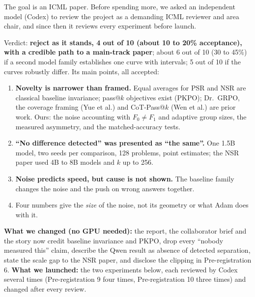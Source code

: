 \documentclass[11pt]{article}
\begin{document}
\begin{why}
The goal is an ICML paper. Before spending more, we asked an independent model (Codex) to review the project as a demanding ICML reviewer and area chair, and since then it reviews every experiment before launch.
\end{why}
\begin{found}
Verdict: \textbf{reject as it stands, 4 out of 10 (about 10 to 20\% acceptance), with a credible path to a main-track paper}; about 6 out of 10 (30 to 45\%) if a second model family establishes one curve with intervals; 5 out of 10 if the curves robustly differ. Its main points, all accepted:
\begin{enumerate}[leftmargin=*,itemsep=1pt]
\item \textbf{Novelty is narrower than framed.} Equal averages for PSR and NSR are classical baseline invariance; pass@$k$ objectives exist (PKPO); Dr.\ GRPO, the coverage framing (Yue et al.) and CoT-Pass@$k$ (Wen et al.) are prior work. Ours: the noise accounting with $F_0\neq F_1$ and adaptive group sizes, the measured asymmetry, and the matched-accuracy tests.
\item \textbf{``No difference detected'' was presented as ``the same''.} One 1.5B model, two seeds per comparison, 128 problems, point estimates; the NSR paper used 4B to 8B models and $k$ up to 256.
\item \textbf{Noise predicts speed, but cause is not shown.} The baseline family changes the noise and the push on wrong answers together.
\item Four numbers give the \emph{size} of the noise, not its geometry or what Adam does with it.
\end{enumerate}
\end{found}
\textbf{What we changed (no GPU needed):} the report, the collaborator brief and the story now credit baseline invariance and PKPO, drop every ``nobody measured this'' claim, describe the Qwen result as absence of detected separation, state the scale gap to the NSR paper, and disclose the clipping in Pre-registration 6. \textbf{What we launched:} the two experiments below, each reviewed by Codex several times (Pre-registration 9 four times, Pre-registration 10 three times) and changed after every review.

\end{document}
